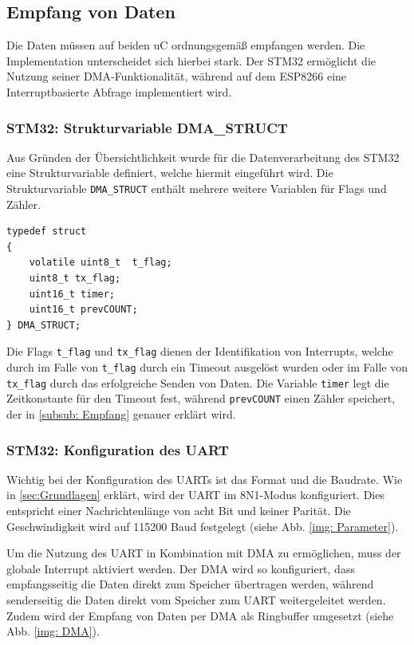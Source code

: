 \subsection{Empfang von Daten}

Die Daten müssen auf beiden \ac{uC} ordnungsgemäß empfangen werden. Die Implementation unterscheidet sich hierbei stark. Der STM32 ermöglicht
die Nutzung seiner \ac{DMA}-Funktionalität, während auf dem ESP8266 eine Interruptbasierte Abfrage implementiert wird.

\subsubsection{STM32: Strukturvariable DMA\_STRUCT}

Aus Gründen der Übersichtlichkeit wurde für die Datenverarbeitung des STM32 eine Strukturvariable definiert, welche hiermit eingeführt wird.
Die Strukturvariable \lstinline!DMA_STRUCT! enthält mehrere weitere Variablen für Flags und Zähler.

\begin{lstlisting}[caption={\textit{DMA Strukturvariable}}]
typedef struct
{
    volatile uint8_t  t_flag;   
    uint8_t tx_flag;			
    uint16_t timer;             
    uint16_t prevCOUNT;         
} DMA_STRUCT;
\end{lstlisting}

Die Flags \lstinline!t_flag! und \lstinline!tx_flag! dienen der Identifikation von Interrupts, welche durch im Falle von \lstinline!t_flag! durch ein
Timeout ausgelöst wurden oder im Falle von \lstinline!tx_flag! durch das erfolgreiche Senden von Daten. Die Variable \lstinline!timer! legt 
die Zeitkonstante für den Timeout fest, während \lstinline!prevCOUNT! einen Zähler speichert, der in \ref{subsub: Empfang} genauer erklärt wird.   

\subsubsection{STM32: Konfiguration des UART}
Wichtig bei der Konfiguration des \acp{UART} ist das Format und die Baudrate. Wie in \ref{sec:Grundlagen} erklärt, wird der \ac{UART} im 8N1-Modus
konfiguriert. Dies entspricht einer Nachrichtenlänge von acht Bit und keiner Parität. Die Geschwindigkeit wird auf 115200 Baud festgelegt (siehe Abb. \ref{img: Parameter}). 

\smallskip

Um die Nutzung des \ac{UART} in Kombination mit \ac{DMA} zu ermöglichen, muss der globale Interrupt
aktiviert werden. Der \ac{DMA} wird so konfiguriert, dass empfangsseitig die Daten direkt zum Speicher übertragen werden, während senderseitig die Daten
direkt vom Speicher zum \ac{UART} weitergeleitet werden. Zudem wird der Empfang von Daten per \ac{DMA} als Ringbuffer umgesetzt (siehe Abb. \ref{img: DMA}).


